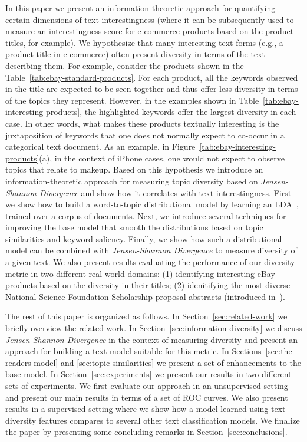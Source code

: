 In this paper we present an information theoretic approach for quantifying certain dimensions of text interestingness (where it can be subsequently used to measure an interestingness score for e-commerce products based on the product titles, for example). We hypothesize that many interesting text forms (e.g., a product title in e-commerce) often present diversity in terms of the text describing them. For example, consider the products shown in the Table~\ref{tab:ebay-standard-products}. For each product, all the keywords observed in the title are expected to be seen together and thus offer less diversity in terms of the topics they represent. However, in the examples shown in Table~\ref{tab:ebay-interesting-products}, the highlighted keywords offer the largest diversity in each case. In other words, what makes these products textually interesting is the juxtaposition of keywords that one does not normally expect to co-occur in a categorical text document. As an example, in Figure~\ref{tab:ebay-interesting-products}(a), in the context of iPhone cases, one would not expect to observe topics that relate to makeup. Based on this hypothesis we introduce an information-theoretic approach for measuring topic diversity based on {\em Jensen-Shannon Divergence} and show how it correlates with text interestingness. First we show how to build a word-to-topic distributional model by learning an LDA~\cite{Blei:2003:LDA:944919.944937}, trained over a corpus of documents. Next, we introduce several techniques for improving the base model that smooth the distributions based on topic similarities and keyword saliency. Finally, we show how such a distributional model can be combined with {\em Jensen-Shannon Divergence} to measure diversity of a given text. We also present results evaluating the performance of our diversity metric in two different real world domains: (1) identifying interesting eBay products based on the diversity in their titles; (2) idenitifying the most diverse National Science Foundation Scholarship proposal abstracts (introduced in~\cite{bache:2013}). 

The rest of this paper is organized as follows. In Section~\ref{sec:related-work} we briefly overview the related work. In Section~\ref{sec:information-diversity} we discuss {\em Jensen-Shannon Divergence} in the context of measuring diversity and present an approach for building a text model suitable for this metric. In Sections~\ref{sec:the-readers-model} and \ref{sec:topic-similarities} we present a set of enhancements to the base model. In Section~\ref{sec:experiments} we present our results in two different sets of experiments. We first evaluate our approach in an unsupervised setting and present our main results in terms of a set of ROC curves. We also present results in a supervised setting where we show how a model learned using text diversity features compares to several other text classification models. We finalize the paper by presenting some concluding remarks in Section~\ref{sec:conclusions}.

